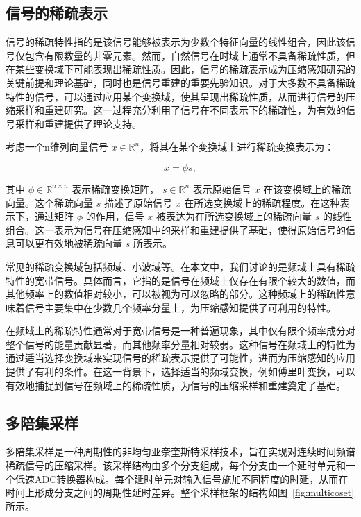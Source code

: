 \subsection{信号的稀疏表示}

信号的稀疏特性指的是该信号能够被表示为少数个特征向量的线性组合，因此该信号仅包含有限数量的非零元素。然而，自然信号在时域上通常不具备稀疏性质，但在某些变换域下可能表现出稀疏性质。因此，信号的稀疏表示成为压缩感知研究的关键前提和理论基础，同时也是信号重建的重要先验知识。对于大多数不具备稀疏特性的信号，可以通过应用某个变换域，使其呈现出稀疏性质，从而进行信号的压缩采样和重建研究。这一过程充分利用了信号在不同表示下的稀疏性，为有效的信号采样和重建提供了理论支持。

考虑一个n维列向量信号 $x \in \mathbb{R}^n $，将其在某个变换域上进行稀疏变换表示为：

\begin{equation}
    x = \phi s,
\end{equation}

其中 $\phi \in \mathbb{R}^{n \times n}$ 表示稀疏变换矩阵， $s \in \mathbb{R}^n$ 表示原始信号 $x$ 在该变换域上的稀疏向量。这个稀疏向量 $s$ 描述了原始信号 $x$ 在所选变换域上的稀疏程度。在这种表示下，通过矩阵 $\phi$ 的作用，信号 $x$ 被表达为在所选变换域上的稀疏向量 $s$ 的线性组合。这一表示为信号在压缩感知中的采样和重建提供了基础，使得原始信号的信息可以更有效地被稀疏向量 $s$ 所表示。

常见的稀疏变换域包括频域、小波域等。在本文中，我们讨论的是频域上具有稀疏特性的宽带信号。具体而言，它指的是信号在频域上仅存在有限个较大的数值，而其他频率上的数值相对较小，可以被视为可以忽略的部分。这种频域上的稀疏性意味着信号主要集中在少数几个频率分量上，为压缩感知提供了可利用的特性。

在频域上的稀疏特性通常对于宽带信号是一种普遍现象，其中仅有限个频率成分对整个信号的能量贡献显著，而其他频率分量相对较弱。这种信号在频域上的特性为通过适当选择变换域来实现信号的稀疏表示提供了可能性，进而为压缩感知的应用提供了有利的条件。在这一背景下，选择适当的频域变换，例如傅里叶变换，可以有效地捕捉到信号在频域上的稀疏性质，为信号的压缩采样和重建奠定了基础。

\subsection{多陪集采样}

多陪集采样是一种周期性的非均匀亚奈奎斯特采样技术，旨在实现对连续时间频谱稀疏信号的压缩采样。该采样结构由多个分支组成，每个分支由一个延时单元和一个低速ADC转换器构成。每个延时单元对输入信号施加不同程度的时延，从而在时间上形成分支之间的周期性延时差异。整个采样框架的结构如图~\ref{fig:multicoset}所示。

